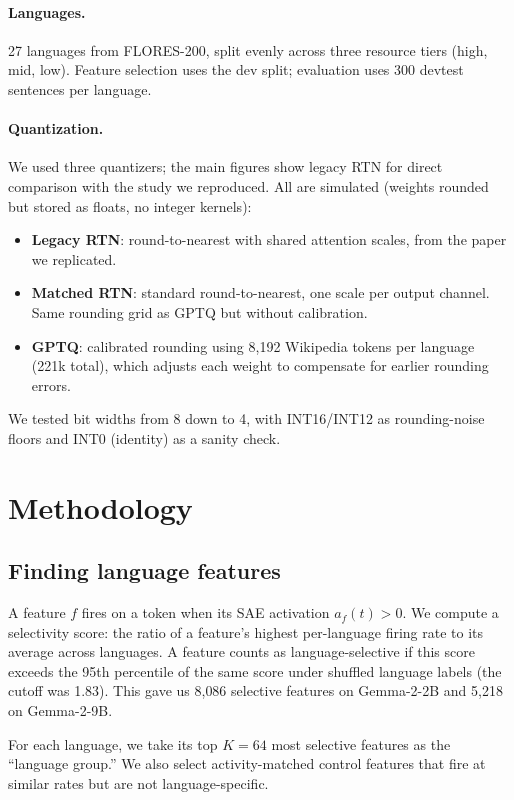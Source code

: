 \documentclass[11pt]{article}
\begin{document}
\paragraph{Languages.} 27 languages from FLORES-200, split evenly across three resource tiers (high, mid, low). Feature selection uses the dev split; evaluation uses 300 devtest sentences per language.

\paragraph{Quantization.} We used three quantizers; the main figures show legacy RTN for direct comparison with the study we reproduced. All are simulated (weights rounded but stored as floats, no integer kernels):

\begin{itemize}
\item \textbf{Legacy RTN}: round-to-nearest with shared attention scales, from the paper we replicated.
\item \textbf{Matched RTN}: standard round-to-nearest, one scale per output channel. Same rounding grid as GPTQ but without calibration.
\item \textbf{GPTQ}: calibrated rounding using 8{,}192 Wikipedia tokens per language (221k total), which adjusts each weight to compensate for earlier rounding errors.
\end{itemize}

\noindent We tested bit widths from 8 down to 4, with INT16/INT12 as rounding-noise floors and INT0 (identity) as a sanity check.

\section{Methodology}

\subsection{Finding language features}

A feature $f$ fires on a token when its SAE activation $a_f(t)>0$. We compute a selectivity score: the ratio of a feature's highest per-language firing rate to its average across languages. A feature counts as language-selective if this score exceeds the 95th percentile of the same score under shuffled language labels (the cutoff was 1.83). This gave us 8{,}086 selective features on Gemma-2-2B and 5{,}218 on Gemma-2-9B.

For each language, we take its top $K{=}64$ most selective features as the ``language group.'' We also select activity-matched control features that fire at similar rates but are not language-specific.
\end{document}
